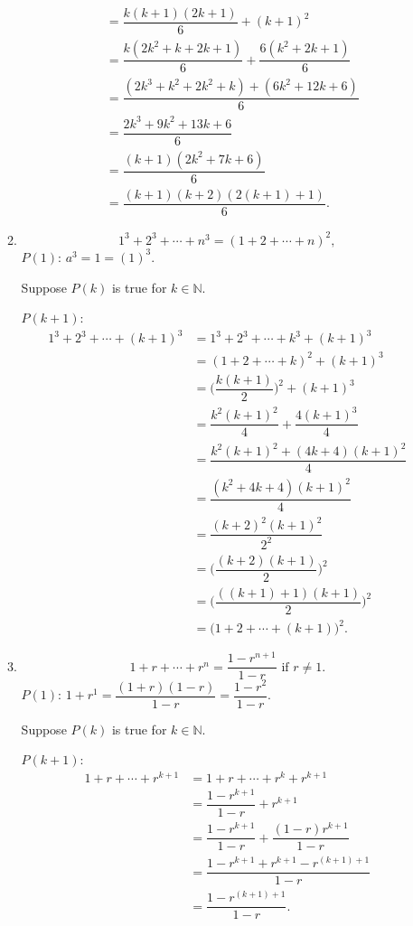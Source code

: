 \documentclass[a4paper,10pt]{book}
\theoremstyle{plain} %
\begin{document}
\begin{enumerate}
\begin{enumerate}[label=(\roman*),align=left]
\begin{align*}
			&= \dfrac{k(k+1)(2k+1)}{6} + (k+1)^2\\
			& = \dfrac{k(2k^2+k+2k+1)}{6} + \dfrac{6(k^2+2k+1)}{6} \\
			& = \dfrac{(2k^3+k^2+2k^2+k)+(6k^2+12k+6)}{6} \\
			&= \dfrac{2k^3+9k^2+13k+6}{6} \\
			&= \dfrac{(k+1)(2k^2+7k+6)}{6} \\
			&= \dfrac{(k+1)(k+2)(2(k+1)+1)}{6}.
		\end{align*}
        \item \[ 1^3 + 2^3 + \cdots + n^3 = (1+2+\cdots +n)^2, \]
        $P(1)$: $a^3 = 1 = (1)^3$.\par
		Suppose $P(k)$ is true for $k \in \mathbb{N}$.\par
		$P(k+1)$: 
		\begin{align*}
			1^3 + 2^3 + \cdots + (k+1)^3 &= 1^3 + 2^3 + \cdots + k^3 + (k+1)^3 \\
			&= (1+2+\cdots +k)^2 + (k+1)^3 \\
			&= \biggl (\dfrac{k(k+1)}{2} \biggr)^2 + (k+1)^3 \\
			&= \dfrac{k^2(k+1)^2}{4} + \dfrac{4(k+1)^3}{4} \\
			&= \dfrac{k^2(k+1)^2+(4k+4)(k+1)^2}{4} \\
			&= \dfrac{(k^2+4k+4)(k+1)^2}{4} \\
			&= \dfrac{(k+2)^2(k+1)^2}{2^2} \\
			&= \biggl (\dfrac{(k+2)(k+1)}{2} \biggr )^2 \\
			&= \biggl (\dfrac{((k+1)+1)(k+1)}{2} \biggr )^2 \\
			&= \biggl (1+2+ \cdots + (k+1) \biggr )^2.
		\end{align*}
        \item \[ 1+r+\cdots +r^n = \dfrac{1-r^{n+1}}{1-r} \text{ if } r \neq 1.\]
        $P(1)$: $1+r^1 = \dfrac{(1+r)(1-r)}{1-r} = \dfrac{1-r^2}{1-r}$.\par
		Suppose $P(k)$ is true for $k \in \mathbb{N}$.\par
		$P(k+1)$: 
		\begin{align*}
			1+r+\cdots +r^{k+1} &= 1+r+\cdots + r^k +r^{k+1} \\
			&= \dfrac{1-r^{k+1}}{1-r} +r^{k+1} \\
			&= \dfrac{1-r^{k+1}}{1-r} +\dfrac{(1-r)r^{k+1}}{1-r} \\
			&= \dfrac{1-r^{k+1} + r^{k+1} - r^{(k+1)+1} }{1-r} \\
			&= \dfrac{1 - r^{(k+1)+1} }{1-r}.
		\end{align*}
    \end{enumerate}
\end{enumerate}
\end{document}
